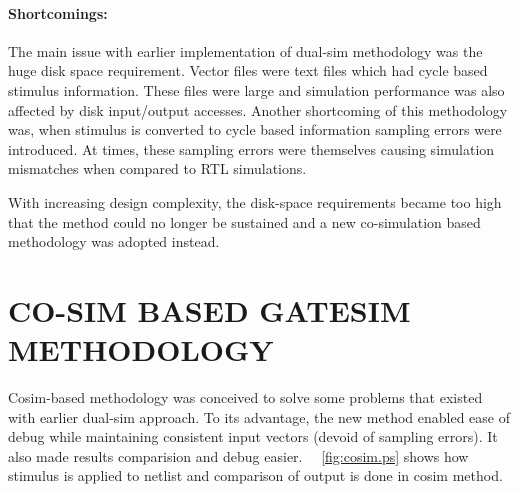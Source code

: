 \paragraph{Shortcomings:}The main issue with earlier implementation of dual-sim methodology was the huge disk space requirement. Vector files were text files which had cycle based stimulus information. These files were large and simulation performance was also affected by disk input/output accesses. Another shortcoming of this methodology was, when stimulus is converted to cycle based information sampling errors were introduced. At times, these sampling errors were themselves causing simulation mismatches when compared to RTL simulations.

 With increasing design complexity, the disk-space requirements became too high that the method could no longer be sustained and a new co-simulation based methodology was adopted instead.





\section{CO-SIM BASED GATESIM METHODOLOGY}
\label{sec:method:csgs}
 Cosim-based methodology was conceived to solve some problems that existed with earlier dual-sim approach. To its advantage, the new method enabled ease of debug while maintaining consistent input vectors (devoid of sampling errors). It also made results comparision and debug easier. ~\figurename{~\ref{fig:cosim.ps}} shows how stimulus is applied to netlist and comparison of output is done in cosim method. %
 
